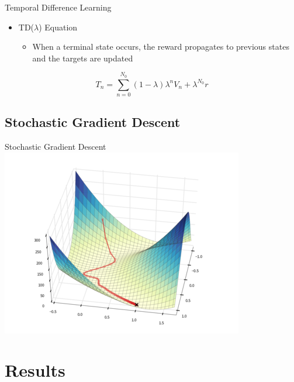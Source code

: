 \begin{frame}{Temporal Difference Learning}
\begin{itemize}
\item TD($\lambda$) Equation
\begin{itemize}
\item When a terminal state occurs, the reward propagates to previous states and the targets are updated
\end{itemize}
\end{itemize}
\begin{equation*}
T_n = \sum_{n=0}^{N_0} (1-\lambda)\lambda^n V_n + \lambda^{N_0} r
\end{equation*}
\end{frame}
\subsection{Stochastic Gradient Descent}

\begin{frame}{Stochastic Gradient Descent}
\includegraphics[width = 0.8 \textwidth]{sgd}\centering
\end{frame}

\section{Results}
\subsection{}

